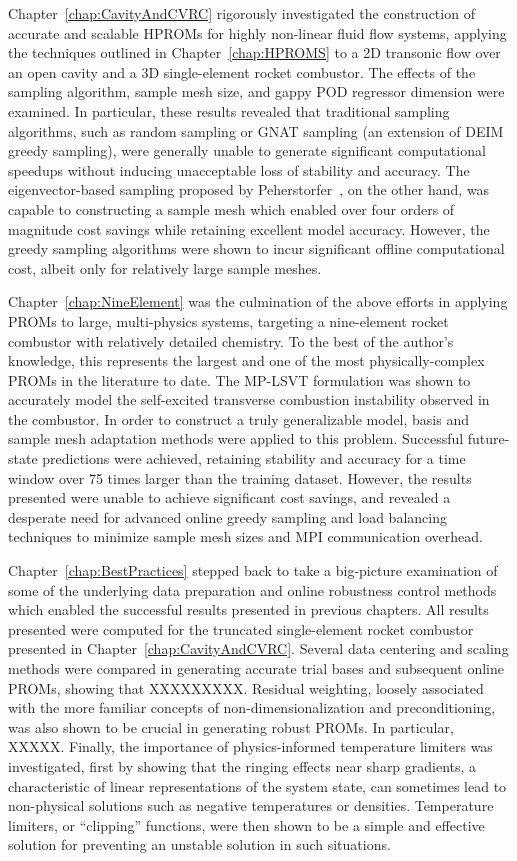 Chapter~\ref{chap:CavityAndCVRC} rigorously investigated the construction of accurate and scalable HPROMs for highly non-linear fluid flow systems, applying the techniques outlined in Chapter~\ref{chap:HPROMS} to a 2D transonic flow over an open cavity and a 3D single-element rocket combustor. The effects of the sampling algorithm, sample mesh size, and gappy POD regressor dimension were examined. In particular, these results revealed that traditional sampling algorithms, such as random sampling or GNAT sampling (an extension of DEIM greedy sampling), were generally unable to generate significant computational speedups without inducing unacceptable loss of stability and accuracy. The eigenvector-based sampling proposed by Peherstorfer~\cite{Peherstorfer2020}, on the other hand, was capable to constructing a sample mesh which enabled over four orders of magnitude cost savings while retaining excellent model accuracy. However, the greedy sampling algorithms were shown to incur significant offline computational cost, albeit only for relatively large sample meshes.

Chapter~\ref{chap:NineElement} was the culmination of the above efforts in applying PROMs to large, multi-physics systems, targeting a nine-element rocket combustor with relatively detailed chemistry. To the best of the author's knowledge, this represents the largest and one of the most physically-complex PROMs in the literature to date. The MP-LSVT formulation was shown to accurately model the self-excited transverse combustion instability observed in the combustor. In order to construct a truly generalizable model, basis and sample mesh adaptation methods were applied to this problem. Successful future-state predictions were achieved, retaining stability and accuracy for a time window over 75 times larger than the training dataset. However, the results presented were unable to achieve significant cost savings, and revealed a desperate need for advanced online greedy sampling and load balancing techniques to minimize sample mesh sizes and MPI communication overhead.

Chapter~\ref{chap:BestPractices} stepped back to take a big-picture examination of some of the underlying data preparation and online robustness control methods which enabled the successful results presented in previous chapters. All results presented were computed for the truncated single-element rocket combustor presented in Chapter~\ref{chap:CavityAndCVRC}. Several data centering and scaling methods were compared in generating accurate trial bases and subsequent online PROMs, showing that {\color{red}XXXXXXXXX}. Residual weighting, loosely associated with the more familiar concepts of non-dimensionalization and preconditioning, was also shown to be crucial in generating robust PROMs. In particular, {\color{red}XXXXX}. Finally, the importance of physics-informed temperature limiters was investigated, first by showing that the ringing effects near sharp gradients, a characteristic of linear representations of the system state, can sometimes lead to non-physical solutions such as negative temperatures or densities. Temperature limiters, or ``clipping'' functions, were then shown to be a simple and effective solution for preventing an unstable solution in such situations.

